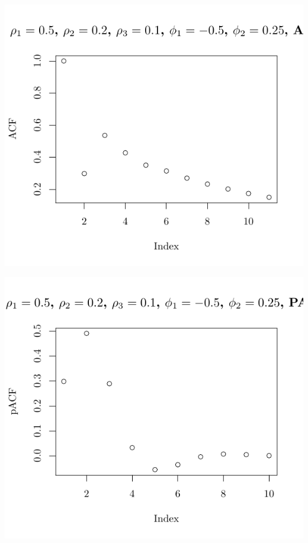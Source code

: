 \documentclass[10pt]{paper}\usepackage[]{graphicx}\usepackage[]{color}
\makeatletter
\def\maxwidth{ %
  \ifdim\Gin@nat@width>\linewidth
    \linewidth
  \else
    \Gin@nat@width
  \fi
}
\newenvironment{knitrout}{}{} %
\makeatother
\begin{document}
\begin{knitrout}
{\centering \includegraphics[width=\maxwidth]{figure/graphics-plotter-203} 

}




{\centering \includegraphics[width=\maxwidth]{figure/graphics-plotter-204} 

}





\end{knitrout}
\end{document}
